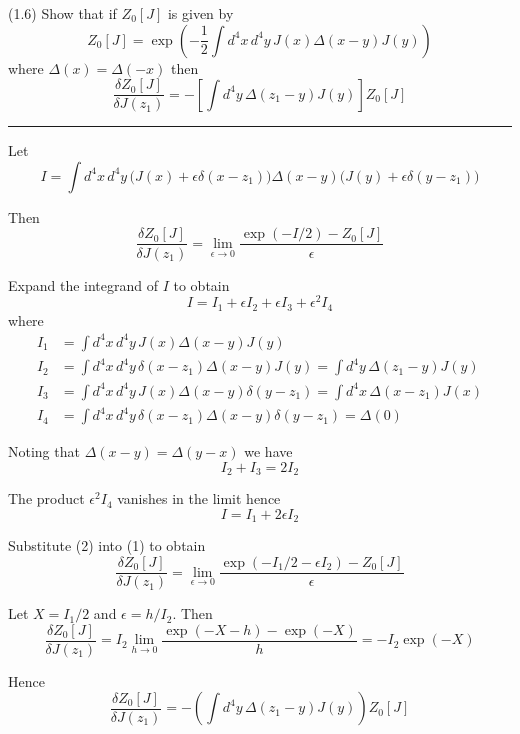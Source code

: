 \documentclass[12pt]{article}
\begin{document}
(1.6)
Show that if $Z_0[J]$ is given by
\begin{equation*}
Z_0[J]=\exp\left(
-\frac{1}{2}\int d^4x\,d^4y\,J(x)\Delta(x-y)J(y)
\right)
\tag{1.49}
\end{equation*}
where $\Delta(x)=\Delta(-x)$ then
\begin{equation*}
\frac{\delta Z_0[J]}{\delta J(z_1)}
=-\left[
\int d^4y\,\Delta(z_1-y)J(y)
\right]Z_0[J]
\tag{1.50}
\end{equation*}

\bigskip
\hrule

\bigskip
Let
\begin{equation*}
I=\int d^4x\,d^4y\,
\big(J(x)+\epsilon\delta(x-z_1)\big)
\Delta(x-y)
\big(J(y)+\epsilon\delta(y-z_1)\big)
\end{equation*}

Then
\begin{equation*}
\frac{\delta Z_0[J]}{\delta J(z_1)}=\lim_{\epsilon\rightarrow0}
\frac{\exp(-I/2)-Z_0[J]}{\epsilon}
\tag{1}
\end{equation*}

Expand the integrand of $I$ to obtain
\begin{equation*}
I=I_1+\epsilon I_2+\epsilon I_3+\epsilon^2 I_4
\end{equation*}
where
\begin{align*}
I_1&=\int d^4x\,d^4y\,J(x)\Delta(x-y)J(y)
\\
I_2&=\int d^4x\,d^4y\,\delta(x-z_1)\Delta(x-y)J(y)=\int d^4y\,\Delta(z_1-y)J(y)
\\
I_3&=\int d^4x\,d^4y\,J(x)\Delta(x-y)\delta(y-z_1)=\int d^4x\,\Delta(x-z_1)J(x)
\\
I_4&=\int d^4x\,d^4y\,\delta(x-z_1)\Delta(x-y)\delta(y-z_1)=\Delta(0)
\end{align*}

Noting that $\Delta(x-y)=\Delta(y-x)$ we have
\begin{equation*}
I_2+I_3=2I_2
\end{equation*}

The product $\epsilon^2I_4$ vanishes in the limit hence
\begin{equation*}
I=I_1+2\epsilon I_2
\tag{2}
\end{equation*}

Substitute (2) into (1) to obtain
\begin{equation*}
\frac{\delta Z_0[J]}{\delta J(z_1)}=\lim_{\epsilon\rightarrow0}
\frac{\exp(-I_1/2-\epsilon I_2)-Z_0[J]}{\epsilon}
\end{equation*}

Let $X=I_1/2$ and $\epsilon=h/I_2$.
Then
\begin{equation*}
\frac{\delta Z_0[J]}{\delta J(z_1)}=I_2\lim_{h\rightarrow0}
\frac{\exp(-X-h)-\exp(-X)}{h}
=-I_2\exp(-X)
\end{equation*}

Hence
\begin{equation*}
\frac{\delta Z_0[J]}{\delta J(z_1)}=-\left(\int d^4y\,\Delta(z_1-y)J(y)\right)Z_0[J]
\end{equation*}
\end{document}
